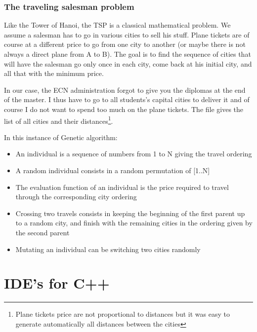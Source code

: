 \documentclass{ecnreport}
\begin{document}
\subsubsection{The traveling salesman problem}

Like the Tower of Hanoi, the TSP is a classical mathematical problem. We assume a salesman has to go in various cities to sell his stuff. Plane tickets are of course at a different price to go from one city to another (or maybe there is not always a direct plane from A to B). The goal is to find the sequence of cities that will have the salesman go only once in each city, come back at his initial city, and all that with the minimum price.

In our case, the ECN administration forgot to give you the diplomas at the end of the master. I thus have to go to all students's capital cities to deliver it and of course I do not want to spend too much on the plane tickets. The file  gives the list of all cities and their distances\footnote{Plane tickets price are not proportional to distances but it was easy to generate automatically all distances between the cities}.

In this instance of Genetic algorithm:
\begin{itemize}
\item An individual is a sequence of numbers from 1 to N giving the travel ordering
\item A random individual consists in a random permutation of [1..N]
\item The evaluation function of an individual is the price required to travel through the corresponding city ordering
\item Crossing two travels consists in keeping the beginning of the first parent up to a random city, and finish with the remaining cities in the ordering given by the second parent
\item Mutating an individual can be switching two cities randomly
\end{itemize}

 \begin{itemize}
 \end{itemize}

\newpage
\appendix

\section{IDE's for C++}\label{app:soft}
\end{document}
